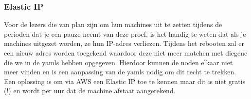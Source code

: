 	\subsubsection{Elastic IP}
	Voor de lezers die van plan zijn om hun machines uit te zetten tijdens de perioden dat je een pauze neemt van deze proef, is het handig te weten dat als je machines uitgezet worden, ze hun IP-adres verliezen. Tijdens het rebooten zal er een nieuw adres worden toegekend waardoor deze niet meer matchen met diegene die we in de yamls hebben opgegeven. Hierdoor kunnen de noden elkaar niet meer vinden en is een aanpassing van de yamls nodig om dit recht te trekken. Een oplossing is om via AWS een Elastic IP toe te kennen maar dit is niet gratis (!) en wordt per uur dat de machine afstaat aangerekend.
